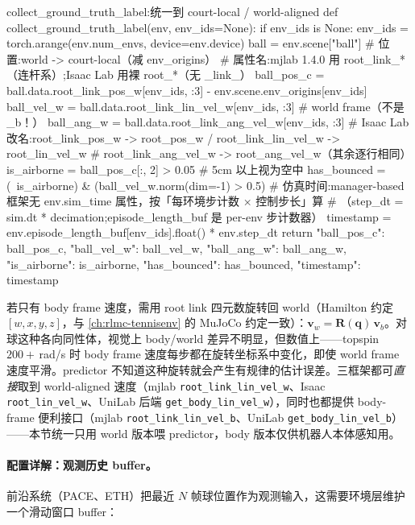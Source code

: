\begin{codebox}[Python]{collect\_ground\_truth\_label:统一到 court-local / world-aligned}
def collect_ground_truth_label(env, env_ids=None):
    if env_ids is None:
        env_ids = torch.arange(env.num_envs, device=env.device)
    ball = env.scene["ball"]
    # 位置:world -> court-local（减 env_origins）
    # 属性名:mjlab 1.4.0 用 root_link_*（连杆系）;Isaac Lab 用裸 root_*（无 _link_）
    ball_pos_c = ball.data.root_link_pos_w[env_ids, :3] - env.scene.env_origins[env_ids]
    ball_vel_w = ball.data.root_link_lin_vel_w[env_ids, :3]  # world frame（不是 _b！）
    ball_ang_w = ball.data.root_link_ang_vel_w[env_ids, :3]
    # Isaac Lab 改名:root_link_pos_w -> root_pos_w / root_link_lin_vel_w -> root_lin_vel_w
    #                root_link_ang_vel_w -> root_ang_vel_w（其余逐行相同）
    is_airborne = ball_pos_c[:, 2] > 0.05                # 5cm 以上视为空中
    has_bounced = (~is_airborne) & (ball_vel_w.norm(dim=-1) > 0.5)
    # 仿真时间:manager-based 框架无 env.sim_time 属性，按「每环境步计数 × 控制步长」算
    # （step_dt = sim.dt * decimation;episode_length_buf 是 per-env 步计数器）
    timestamp = env.episode_length_buf[env_ids].float() * env.step_dt
    return {"ball_pos_c": ball_pos_c, "ball_vel_w": ball_vel_w,
            "ball_ang_w": ball_ang_w, "is_airborne": is_airborne,
            "has_bounced": has_bounced, "timestamp": timestamp}
\end{codebox}

若只有 body frame 速度，需用 root link 四元数旋转回 world（Hamilton 约定 $[w,x,y,z]$，与 \cref{ch:rlmc-tennisenv} 的 MuJoCo 约定一致）：$\mathbf v_w=\mathbf R(\mathbf q)\,\mathbf v_b$。对球这种各向同性体，视觉上 body/world 差异不明显，但数值上——topspin $200+$\,rad/s 时 body frame 速度每步都在旋转坐标系中变化，即使 world frame 速度平滑。predictor 不知道这种旋转就会产生有规律的估计误差。三框架都可\emph{直接}取到 world-aligned 速度（mjlab \texttt{root\_link\_lin\_vel\_w}、Isaac \texttt{root\_lin\_vel\_w}、UniLab 后端 \texttt{get\_body\_lin\_vel\_w}），同时也都提供 body-frame 便利接口（mjlab \texttt{root\_link\_lin\_vel\_b}、UniLab \texttt{get\_body\_lin\_vel\_b}）——本节统一只用 world 版本喂 predictor，body 版本仅供机器人本体感知用。

\paragraph{配置详解：观测历史 buffer。}前沿系统（PACE\cite{tennis_pace2025}、ETH\cite{tennis_eth2025badminton}）把最近 $N$ 帧球位置作为观测输入，这需要环境层维护一个滑动窗口 buffer：

